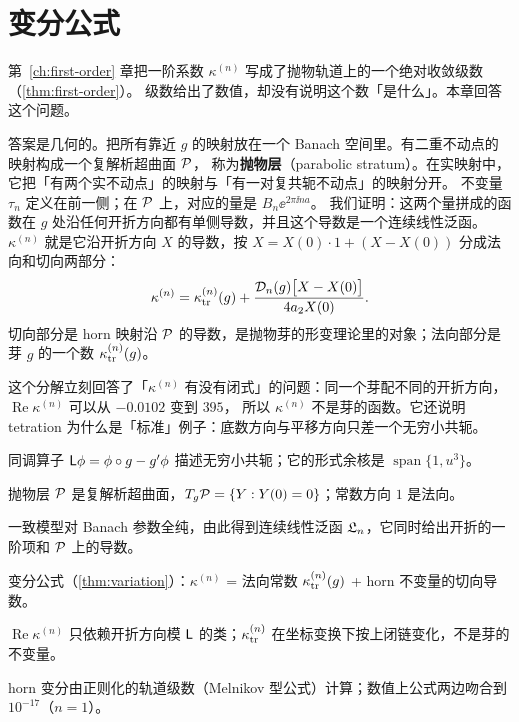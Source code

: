 
\chapter{变分公式}\label{ch:variation}

第~\ref{ch:first-order} 章把一阶系数 $\kappa^{(n)}$ 写成了抛物轨道上的一个绝对收敛级数（\cref{thm:first-order}）。
级数给出了数值，却没有说明这个数「是什么」。本章回答这个问题。

答案是几何的。把所有靠近 $g$ 的映射放在一个 Banach 空间里。有二重不动点的映射构成一个复解析超曲面 $\mathcal P$，
称为\textbf{抛物层}（parabolic stratum）。在实映射中，它把「有两个实不动点」的映射与「有一对复共轭不动点」的映射分开。
不变量 $\tau_n$ 定义在前一侧；在 $\mathcal P$ 上，对应的量是 $B_n\ee^{2\pi\ii na}$。
我们证明：这两个量拼成的函数在 $g$ 处沿任何开折方向都有单侧导数，并且这个导数是一个连续线性泛函。
$\kappa^{(n)}$ 就是它沿开折方向 $X$ 的导数，按 $X=X(0)\cdot1+(X-X(0))$ 分成法向和切向两部分：
\[
 \kappa^{(n)}=\kappa_{\mathrm{tr}}^{(n)}(g)+\frac{\mathcal D_n(g)\bigl[X-X(0)\bigr]}{4a_2X(0)} .
\]
切向部分是 horn 映射沿 $\mathcal P$ 的导数，是抛物芽的形变理论里的对象；法向部分是芽 $g$ 的一个数 $\kappa_{\mathrm{tr}}^{(n)}(g)$。

这个分解立刻回答了「$\kappa^{(n)}$ 有没有闭式」的问题：同一个芽配不同的开折方向，$\operatorname{Re}\kappa^{(n)}$ 可以从 $-0.0102$ 变到 $395$，
所以 $\kappa^{(n)}$ 不是芽的函数。它还说明 tetration 为什么是「标准」例子：底数方向与平移方向只差一个无穷小共轭。

\begin{goals}
\item 同调算子 $\mathsf L\phi=\phi\circ g-g'\phi$ 描述无穷小共轭；它的形式余核是 $\operatorname{span}\{1,u^3\}$。
\item 抛物层 $\mathcal P$ 是复解析超曲面，$T_g\mathcal P=\{Y:Y(0)=0\}$；常数方向 $1$ 是法向。
\item 一致模型对 Banach 参数全纯，由此得到连续线性泛函 $\mathfrak L_n$，它同时给出开折的一阶项和 $\mathcal P$ 上的导数。
\item 变分公式（\cref{thm:variation}）：$\kappa^{(n)}$ = 法向常数 $\kappa_{\mathrm{tr}}^{(n)}(g)$ + horn 不变量的切向导数。
\item $\operatorname{Re}\kappa^{(n)}$ 只依赖开折方向模 $\mathsf L$ 的类；$\kappa_{\mathrm{tr}}^{(n)}$ 在坐标变换下按上闭链变化，不是芽的不变量。
\item horn 变分由正则化的轨道级数（Melnikov 型公式）计算；数值上公式两边吻合到 $10^{-17}$（$n=1$）。
\end{goals}

